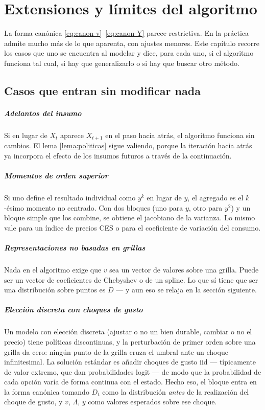 \chapter{Extensiones y límites del algoritmo}
\label{cap:extensiones}

La forma canónica \eqref{eq:canon-v}--\eqref{eq:canon-Y} parece restrictiva.
En la práctica admite mucho más de lo que aparenta, con ajustes menores. Este
capítulo recorre los casos que uno se encuentra al modelar y dice, para cada
uno, si el algoritmo funciona tal cual, si hay que generalizarlo o si hay que
buscar otro método.

\section{Casos que entran sin modificar nada}

\paragraph{Adelantos del insumo} Si en lugar de $X_t$ aparece $X_{t+1}$ en el
paso hacia atrás, el algoritmo funciona sin cambios. El lema
\ref{lema:politicas} sigue valiendo, porque la iteración hacia atrás ya
incorpora el efecto de los insumos futuros a través de la continuación.

\paragraph{Momentos de orden superior} Si uno define el resultado individual como
$y^k$ en lugar de $y$, el agregado es el $k$-ésimo momento no centrado. Con dos
bloques (uno para $y$, otro para $y^2$) y un bloque simple que los combine, se
obtiene el jacobiano de la varianza. Lo mismo vale para un índice de precios CES
o para el coeficiente de variación del consumo.

\paragraph{Representaciones no basadas en grillas} Nada en el algoritmo exige
que $v$ sea un vector de valores sobre una grilla. Puede ser un vector de
coeficientes de Chebyshev o de un spline. Lo que sí tiene que ser una
distribución sobre puntos es $D$ --- y aun eso se relaja en la sección
siguiente.

\paragraph{Elección discreta con choques de gusto} Un modelo con elección
discreta (ajustar o no un bien durable, cambiar o no el precio) tiene políticas
discontinuas, y la perturbación de primer orden sobre una grilla da cero: ningún
punto de la grilla cruza el umbral ante un choque infinitesimal. La solución
estándar es añadir choques de gusto iid --- típicamente de valor extremo, que dan
probabilidades logit --- de modo que la probabilidad de cada opción varía de
forma continua con el estado. Hecho eso, el bloque entra en la forma canónica
tomando $D_t$ como la distribución \emph{antes} de la realización del choque de
gusto, y $v$, $\Lambda$, $y$ como valores esperados sobre ese choque.

